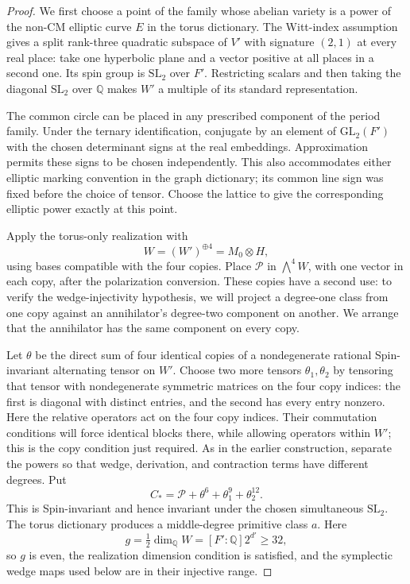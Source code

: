 \documentclass[11pt]{article}
\numberwithin{equation}{section}
\theoremstyle{definition}
\theoremstyle{remark}
\newcommand{\Q}{\mathbb Q}
\begin{document}
\begin{proof}
We first choose a point of the family whose abelian
variety is a power of the non-CM elliptic curve $E$
in the torus dictionary.  The Witt-index assumption
gives a split rank-three quadratic subspace of $V'$
with signature $(2,1)$ at every real place: take one
hyperbolic plane and a vector positive at all places
in a second one.  Its spin group is $\mathrm{SL}_2$
over $F'$.  Restricting scalars and then taking the
diagonal $\mathrm{SL}_2$ over $\Q$ makes $W'$ a
multiple of its standard representation.

The common circle can be placed in any prescribed
component of the period family.  Under the ternary
identification, conjugate by an element of
$\mathrm{GL}_2(F')$ with the chosen determinant signs
at the real embeddings.  Approximation permits these
signs to be chosen independently.  This also accommodates
either elliptic marking convention in the graph
dictionary; its common line sign was fixed before the
choice of tensor.  Choose the lattice to give the
corresponding elliptic power exactly at this point.

Apply the torus-only realization with
\[
 W=(W')^{\oplus4}=M_0\otimes H,
\]
using bases compatible with the four copies.  Place
$\mathcal P$ in $\bigwedge^4W$, with one vector in
each copy, after the polarization conversion.  These copies
have a second use: to verify the wedge-injectivity hypothesis,
we will project a degree-one class from one copy against an
annihilator's degree-two component on another.  We arrange
that the annihilator has the same component on every copy.

Let
$\theta$ be the direct sum of four identical copies
of a nondegenerate rational Spin-invariant alternating
tensor on $W'$.  Choose two more tensors
$\theta_1,\theta_2$ by tensoring that tensor with
nondegenerate symmetric matrices on the four copy
indices: the first is diagonal with distinct entries,
and the second has every entry nonzero.  Here the relative
operators act on the four copy indices.  Their commutation
conditions will force identical blocks there, while allowing
operators within $W'$; this is the copy condition just required.
As in the earlier construction, separate the powers so that
wedge, derivation, and contraction terms have different degrees.
Put
\begin{equation}
 \label{aux:test-tensor}
 C_* =\mathcal P+\theta^6+\theta_1^9+\theta_2^{12}.
\end{equation}
This is Spin-invariant and hence invariant under the
chosen simultaneous $\mathrm{SL}_2$.  The torus
dictionary produces a middle-degree primitive class
$a$.  Here
\[
 g=\tfrac12\dim_{\Q}W=[F':\Q]2^{d'}\ge32,
\]
so $g$ is even, the realization dimension condition is
satisfied, and the symplectic wedge maps used below
are in their injective range.


\end{proof}
\end{document}
